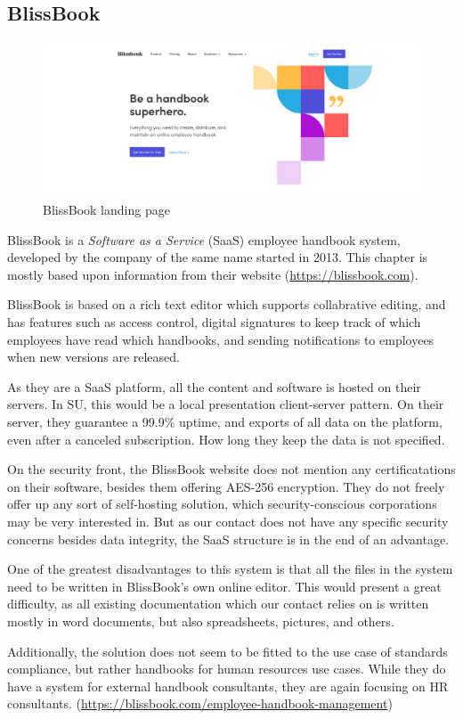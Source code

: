 \subsection{BlissBook}
\begin{figure}[h]
	\includegraphics[width=1\textwidth]{billeder/BlissBooks.png}
	\caption{BlissBook landing page}
\end{figure}
BlissBook is a \textit{Software as a Service} (SaaS) employee handbook system, developed by the company of the same name started in 2013. %
This chapter is mostly based upon information from their website (\url{https://blissbook.com}).


BlissBook is based on a rich text editor which supports collabrative editing, and has features such as access control, digital signatures to keep track of which employees have read which handbooks, and sending notifications to employees when new versions are released.

As they are a SaaS platform, all the content and software is hosted on their servers. In SU, this would be a local presentation client-server pattern.
On their server, they guarantee a 99.9\% uptime, and exports of all data on the platform, even after a canceled subscription. How long they keep the data is not specified.

On the security front, the BlissBook website does not mention any certificatations on their software, besides them offering AES-256 encryption. %
They do not freely offer up any sort of self-hosting solution, which security-conscious corporations may be very interested in. But as our contact does not have any specific security concerns besides data integrity, the SaaS structure is in the end of an advantage.

One of the greatest disadvantages to this system is that all the files in the system need to be written in BlissBook's own online editor. This would present a great difficulty, as all existing documentation which our contact relies on is written mostly in word documents, but also spreadsheets, pictures, and others.

Additionally, the solution does not seem to be fitted to the use case of standards compliance, but rather handbooks for human resources use cases. While they do have a system for external handbook consultants, they are again focusing on HR consultants. (\url{https://blissbook.com/employee-handbook-management})
